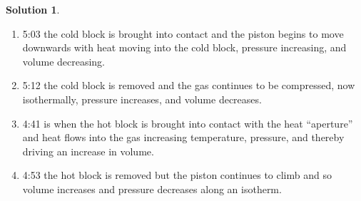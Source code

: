 \documentclass[10pt]{article}
\theoremstyle{definition}
\newtheorem{soln}{Solution}
\begin{document}
\begin{soln}
\begin{center}
    \begin{enumerate}[label=(\alph*)]
      \item 5:03 the cold block is brought into contact and the piston begins to move downwards with heat moving into the cold block, pressure increasing, and volume
            decreasing.
      \item 5:12 the cold block is removed and the gas continues to be compressed, now isothermally, pressure increases, and volume decreases.
      \item 4:41 is when the hot block is brought into contact with the heat ``aperture'' and heat flows into the gas
            increasing temperature, pressure, and thereby driving an increase in volume.
      \item 4:53 the hot block is removed but the piston continues to climb and so volume increases and pressure decreases along an isotherm.
    \end{enumerate}
  \end{center}
\end{soln}
\newpage
\end{document}
